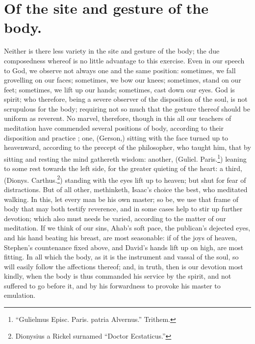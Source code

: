 \section{Of the site and gesture of the body.}
Neither is there less variety in the site and gesture of the body; the due composedness whereof is no little advantage to this exercise. Even in our speech to God, we observe not always one and the same position: sometimes, we fall grovelling on our faces; sometimes, we bow our knees; sometimes, stand on our feet; sometimes, we lift up our hands; sometimes, cast down our eyes. God is spirit; who therefore, being a severe observer of the disposition of the soul, is not scrupulous for the body; requiring not so much that the gesture thereof should be uniform as reverent. No marvel, therefore, though in this all our teachers of meditation have commended several positions of body, according to their disposition and practice ; one, (Gerson,) sitting with the face turned up to heavenward, according to the precept of the philosopher, who taught him, that by sitting and resting the mind gathereth wisdom: another, (Guliel. Paris.\footnote{``Gulielmus Episc. Paris. patria Alvernus.'' Trithem.}) leaning to some rest towards the left side, for the greater quieting of the heart: a third, (Dionys. Carthus.\footnote{Dionysius a Rickel surnamed ``Doctor Ecstaticus.''}) standing with the eyes lift up to heaven; but shut for fear of distractions. But of all other, methinketh, Isaac's choice the best, who meditated walking. In this, let every man be his own master; so be, we use that frame of body that may both testify reverence, and in some cases help to stir up further devotion; which also must needs be varied, according to the matter of our meditation. If we think of our sins, Ahab's soft pace, the publican's dejected eyes, and his hand beating his breast, are most seasonable: if of the joys of heaven, Stephen's countenance fixed above, and David's hands lift up on high, are most fitting. In all which the body, as it is the instrument and vassal of the soul, so will easily follow the affections thereof; and, in truth, then is our devotion most kindly, when the body is thus commanded his service by the spirit, and not suffered to go before it, and by his forwardness to provoke his master to emulation. 
